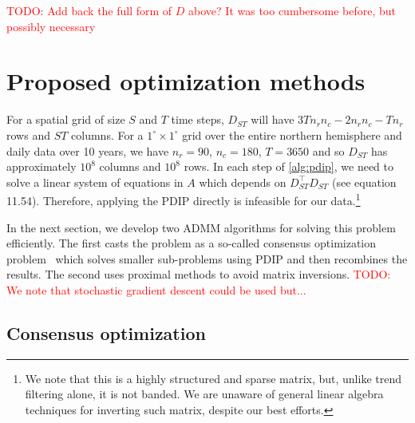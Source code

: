 \documentclass{article}
\DeclareMathOperator*{\argmin}{argmin}
\newcommand{\attn}[1]{\textcolor{red}{TODO: #1}}
\newcommand{\norm}[1]{\left\lVert #1 \right\rVert}
\begin{document}
\attn{Add back the full form of $D$ above? It was too cumbersome
  before, but possibly necessary}

\section{Proposed optimization methods}
\label{sec:prop-optim-meth}

For a spatial grid of size $S$ and $T$ time steps, $D_{ST}$ will have
$3Tn_rn_c-2n_rn_c-Tn_r$ rows and $ST$ columns. For a $1^\circ\times
1^\circ$ grid over the
entire northern hemisphere and daily data over 10 years, we have
$n_r=90$, $n_c=180$, $T=3650$ and so $D_{ST}$ has approximately
$10^8$ columns and $10^8$
rows. In each
step of \autoref{alg:pdip}, we need to solve a linear system of
equations in $A$ which depends on $D_{ST}^\top D_{ST}$ (see \citep{boyd_convex_2004}
equation 11.54). Therefore, 
applying the PDIP directly is infeasible for our data.\footnote{We note that this
  is a highly structured and sparse matrix, but, unlike trend
  filtering alone, it is not banded. We are unaware of general
  linear algebra techniques for inverting such matrix, despite our
  best efforts.} 

In the next section, we develop two ADMM algorithms for solving this
problem efficiently. The first casts the problem as a
so-called consensus optimization problem~\citep{boyd_distributed_2011}
which solves smaller sub-problems using PDIP and then recombines the results. The
second uses proximal methods to avoid matrix inversions. 
\attn{We note that stochastic gradient descent could be used but...}

\subsection{Consensus optimization}
\label{sec:consOpt}

\end{document}
